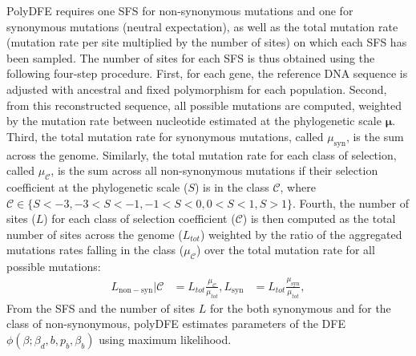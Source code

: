\documentclass{article}
\newcommand{\UniDimArray}[1]{\bm{#1}}
\newcommand{\Sphy}{S}
\newcommand{\Sphyclass}{\mathcal{C}}
\newcommand{\divStrongDel}{\Sphy < -3}
\newcommand{\divDel}{-3 < \Sphy < -1}
\newcommand{\divWeakDel}{-1 < \Sphy < 0}
\newcommand{\divWeakAdv}{0 < \Sphy < 1}
\newcommand{\divAdv}{ \Sphy > 1}
\newcommand{\Spop}{\beta}
\begin{document}
    PolyDFE requires one SFS for non-synonymous mutations and one for synonymous mutations (neutral expectation), as well as the total mutation rate (mutation rate per site multiplied by the number of sites) on which each SFS has been sampled.
    The number of sites for each SFS is thus obtained using the following four-step procedure.
    First, for each gene, the reference DNA sequence is adjusted with ancestral and fixed polymorphism for each population.
    Second, from this reconstructed sequence, all possible mutations are computed, weighted by the mutation rate between nucleotide estimated at the phylogenetic scale $\UniDimArray{\mu}$.
    Third, the total mutation rate for synonymous mutations, called $\mu_{\mathrm{syn}}$, is the sum across the genome.
    Similarly, the total mutation rate for each class of selection, called  $\mu_{\Sphyclass}$, is the sum across all non-synonymous mutations if their selection coefficient at the phylogenetic scale ($\Sphy$) is in the class $\Sphyclass$, where $\Sphyclass \in \{\divStrongDel, \divDel, \divWeakDel, \divWeakAdv, \divAdv \}$.
    Fourth, the number of sites ($L$) for each class of selection coefficient ($\Sphyclass$) is then computed as the total number of sites across the genome ($L_{tot}$) weighted by the ratio of the aggregated mutations rates falling in the class ($\mu_{\Sphyclass}$) over the total mutation rate for all possible mutations:
    \begin{align*}
        L_{\mathrm{non-syn}} | \Sphyclass &= L_{tot} \frac{\mu_{\Sphyclass}}{\mu_{tot}},
        L_{\mathrm{syn}} &= L_{tot} \frac{\mu_{\mathrm{syn}}}{\mu_{tot}},
    \end{align*}
    From the SFS and the number of sites $L$ for the both synonymous and for the class of non-synonymous, polyDFE estimates parameters of the DFE $\phi \left( \Spop; \Spop_d , b, p_b, \Spop_b \right)$ using maximum likelihood.
\end{document}
